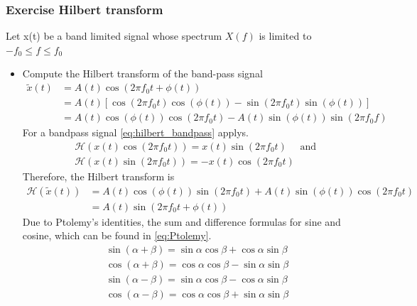 \subsubsection{Exercise Hilbert transform}
Let x(t) be a band limited signal whose spectrum $X(f)$ is limited to $-f_0 \leq f \leq f_0$
\begin{itemize}
    \item Compute the Hilbert transform of the band-pass signal
    $$
    \begin{aligned}
    \tilde{x}(t) & =A(t) \cos \left(2 \pi f_0 t+\phi(t)\right) \\
    & =A(t)\left[\cos \left(2 \pi f_0 t\right) \cos (\phi(t))-\sin \left(2 \pi f_0 t\right) \sin (\phi(t))\right] \\
    & =A(t) \cos (\phi(t)) \cos \left(2 \pi f_0 t\right)-A(t) \sin (\phi(t)) \sin \left(2 \pi f_0 f\right)
    \end{aligned}
    $$
    For a bandpass signal \autoref{eq:hilbert_bandpass} applys.
    \begin{equation}\label{eq:hilbert_bandpass}
    \begin{aligned}
    & \mathcal{H}\left(x(t) \cos \left(2 \pi f_0 t\right)\right)=x(t) \sin \left(2 \pi f_0 t\right) \quad \text { and } \\
    & \mathcal{H}\left(x(t) \sin \left(2 \pi f_0 t\right)\right)=-x(t) \cos \left(2 \pi f_0 t\right)
    \end{aligned}
    \end{equation}
    Therefore, the Hilbert transform is 
    $$
    \begin{aligned}
    \mathcal{H}(\tilde{x}(t)) & =A(t) \cos (\phi(t)) \sin \left(2 \pi f_0 t\right)+A(t) \sin (\phi(t)) \cos \left(2 \pi f_0 t\right) \\
    & =A(t) \sin \left(2 \pi f_0 t+\phi(t)\right)
    \end{aligned}
    $$
    Due to Ptolemy's identities, the sum and difference formulas for sine and cosine, which can be found in \autoref{eq:Ptolemy}.
    \begin{equation}\label{eq:Ptolemy}
    \begin{aligned}
    & \sin (\alpha+\beta)=\sin \alpha \cos \beta+\cos \alpha \sin \beta \\
    & \cos (\alpha+\beta)=\cos \alpha \cos \beta-\sin \alpha \sin \beta \\
    & \sin (\alpha-\beta)=\sin \alpha \cos \beta-\cos \alpha \sin \beta \\
    & \cos (\alpha-\beta)=\cos \alpha \cos \beta+\sin \alpha \sin \beta

\end{aligned}
\end{equation}
\end{itemize}
